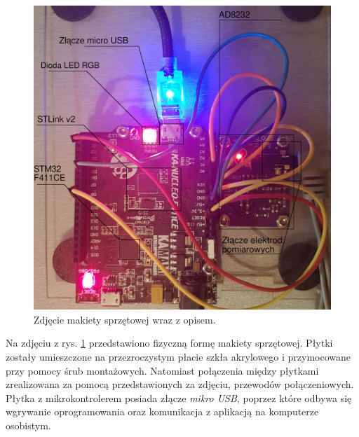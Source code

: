 \newpage

\begin{figure}[h!]
    \centering 
    \includegraphics[scale=0.9]{pl/media/devimg.jpg}
    \caption{Zdjęcie makiety sprzętowej wraz z opisem.}
    \label{fig:devimg}
\end{figure}

Na zdjęciu z rys. \ref{fig:devimg} przedstawiono fizyczną formę makiety sprzętowej.
Płytki zostały umieszczone na przezroczystym płacie szkła akrylowego i przymocowane przy
pomocy śrub montażowych. Natomiast połączenia między płytkami zrealizowana za pomocą
przedstawionych za zdjęciu, przewodów połączeniowych. Płytka z mikrokontrolerem
posiada złącze \textit{mikro USB}, poprzez które odbywa się wgrywanie oprogramowania
oraz komunikacja z aplikacją na komputerze osobistym.


